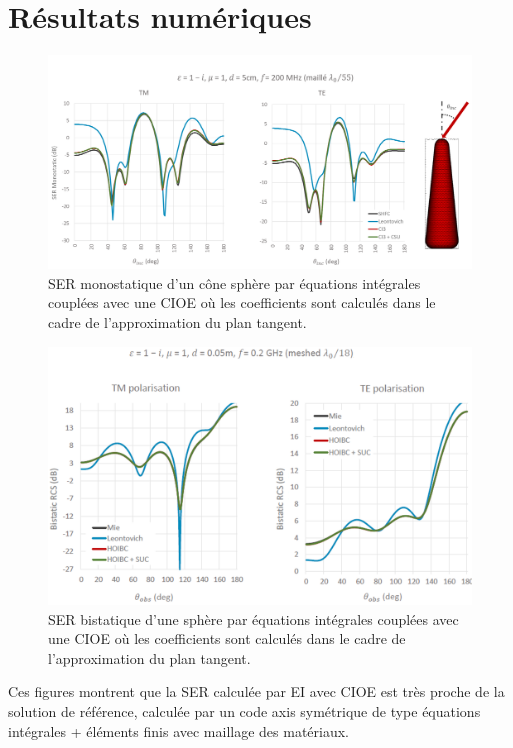 \section{Résultats numériques}

  \begin{figure}[!hbt]
    \centering
    \includegraphics[width=\textwidth]{images/ser/cone_sphere_mono.png}
    \caption{SER monostatique d'un cône sphère par équations intégrales couplées avec une CIOE où les coefficients sont calculés dans le cadre de l'approximation du plan tangent.}
    \label{fig:ser:cone-sphere-mono-M1}
  \end{figure}


  \begin{figure}[!hbt]
    \centering
    \includegraphics[width=\textwidth]{images/ser/sphere_bis.png}
    \caption{SER bistatique d'une sphère par équations intégrales couplées avec une CIOE où les coefficients sont calculés dans le cadre de l'approximation du plan tangent.}
    \label{fig:ser:sphere-bis-M1}
  \end{figure}

  Ces figures montrent que la SER calculée par EI avec CIOE est très proche de la solution de référence, calculée par un code axis symétrique de type équations intégrales + éléments finis avec maillage des matériaux.
